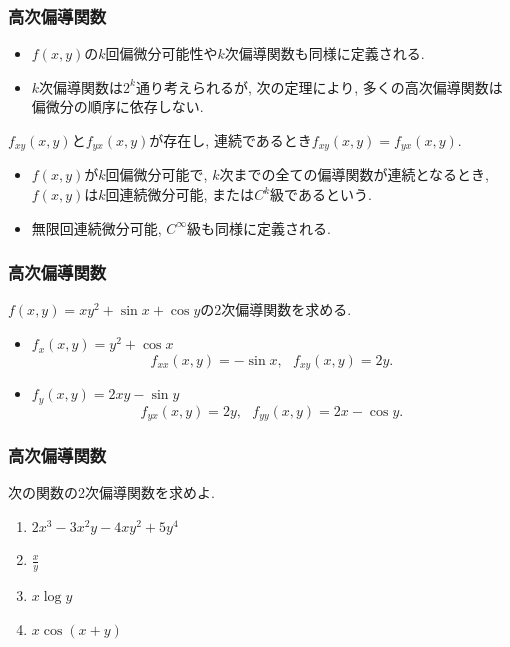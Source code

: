 

\begin{frame}
\frametitle{高次偏導関数}

\begin{itemize}
\item $f(x,y)$の$k$回偏微分可能性や$k$次偏導関数も同様に定義される. 
\item $k$次偏導関数は$2^k$通り考えられるが, 次の定理により, 多くの高次偏導関数は偏微分の順序に依存しない.  
\end{itemize}

\begin{Thm}
$f_{xy}(x,y)$と$f_{yx}(x,y)$が存在し, 連続であるとき$f_{xy}(x,y)=f_{yx}(x,y)$. 
\end{Thm}

\begin{itemize}
\item $f(x,y)$が$k$回偏微分可能で, $k$次までの全ての偏導関数が連続となるとき, $f(x,y)$は$k$回連続微分可能, または$C^k$級であるという. 
\item 無限回連続微分可能, $C^\infty$級も同様に定義される.
\end{itemize}
\end{frame}




\begin{frame}
\frametitle{高次偏導関数}

$f(x,y)=xy^2+\sin x + \cos y$の$2$次偏導関数を求める. 

\begin{itemize}
\item $f_x(x,y)=y^2+\cos x$
$$
f_{xx}(x,y)=-\sin x, \ \ \ f_{xy}(x,y)=2y. 
$$
\item $f_y(x,y)=2xy-\sin y$
$$
f_{yx}(x,y)=2y, \ \ \ f_{yy}(x,y)=2x-\cos y. 
$$
\end{itemize}
\end{frame}




\begin{frame}
\frametitle{高次偏導関数}

\begin{Prob}
次の関数の2次偏導関数を求めよ. 
\begin{enumerate}
\item $2x^3-3x^2y-4xy^2+5y^4$
\item $\frac{x}{y}$
\item $x \log y$
\item $x \cos(x+y)$
\end{enumerate}
\end{Prob}

\end{frame}

